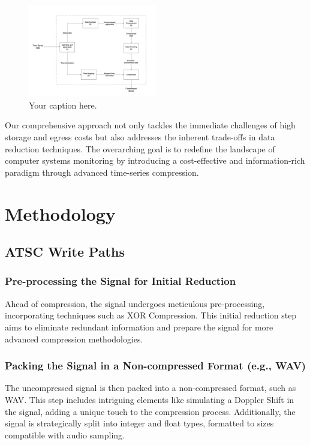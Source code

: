 \documentclass[conference]{IEEEtran}
\begin{document}
  
\begin{figure}[h]
  \centering
  \includegraphics[width=0.5\textwidth]{Fig2.png}
  \caption{Your caption here.}
  \label{Fig.2}
\end{figure}

Our comprehensive approach not only tackles the immediate challenges of high storage and egress costs but also addresses the inherent trade-offs in data reduction techniques. The overarching goal is to redefine the landscape of computer systems monitoring by introducing a cost-effective and information-rich paradigm through advanced time-series compression. 



\section{Methodology}

\subsection{ATSC Write Paths}

\subsubsection{Pre-processing the Signal for Initial Reduction}
Ahead of compression, the signal undergoes meticulous pre-processing, incorporating techniques such as XOR Compression. This initial reduction step aims to eliminate redundant information and prepare the signal for more advanced compression methodologies.

\vspace{10pt}
\subsubsection{Packing the Signal in a Non-compressed Format (e.g., WAV)}
The uncompressed signal is then packed into a non-compressed format, such as WAV. This step includes intriguing elements like simulating a Doppler Shift in the signal, adding a unique touch to the compression process. Additionally, the signal is strategically split into integer and float types, formatted to sizes compatible with audio sampling. 
\end{document}
